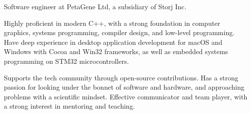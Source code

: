 

\begin{cvparagraph}

Software engineer at PetaGene Ltd, a subsidiary of Storj Inc.

Highly proficient in modern C++, with a strong foundation in computer graphics, systems programming, compiler design, and low-level programming.
Have deep experience in desktop application development for macOS and Windows with Cocoa and Win32 frameworks, as well as embedded systems programming on STM32 microcontrollers.

Supports the tech community through open-source contributions. Has a strong passion for looking under the bonnet of software and hardware, and approaching problems with a scientific mindset. Effective communicator and team player, with a strong interest in mentoring and teaching.

\end{cvparagraph}
